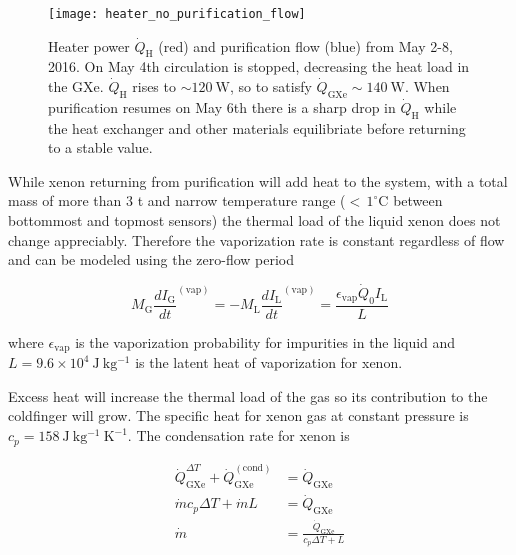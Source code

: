 \begin{figure}
\centering
\texttt{[image: heater\_no\_purification\_flow]}
\caption[Heater power $\dot{Q}_{\mathrm{H}}$ and purification flow from May 2-8, 2016.  Circulation is stopped on May 4th and resumed on the
6th, forcing $\dot{Q}_{\mathrm{H}}$ and $\dot{Q}_{\mathrm{GXe}}$ to equilibriate to new conditions.]{Heater power $\dot{Q}_{\mathrm{H}}$
(red) and purification flow (blue) from May 2-8, 2016.  On May 4th circulation is stopped,
decreasing the heat load in the GXe.  $\dot{Q}_{\mathrm{H}}$ rises to ${\sim}120\ \mathrm{W}$, so to satisfy
 $\dot{Q}_{\mathrm{GXe}} \sim 140\ \mathrm{W}$.  When purification resumes on
May 6th there is a sharp drop in $\dot{Q}_{\mathrm{H}}$ while the heat exchanger and other materials equilibriate before returning to a
stable value.}
\label{fig:electron_lifetime_model_vap_and_cond_no_flow}
\end{figure}

While xenon returning from purification will add heat to the system, with a total mass of more than 3 t and narrow temperature range
(${<}\, 1^{\circ}\mathrm{C}$ between bottommost and topmost sensors) the thermal load of the liquid xenon does not
change appreciably.  Therefore the vaporization rate is constant regardless of flow and can be modeled using the zero-flow period

\vspace{-10pt}

\begin{equation}
M_{\mathrm{G}} \frac{dI_{\mathrm{G}}}{dt}^{(\mathrm{vap})} = -M_{\mathrm{L}} \frac{dI_{\mathrm{L}}}{dt}^{(\mathrm{vap})} =
\frac{\epsilon_{\mathrm{vap}} \dot{Q}_0 I_{\mathrm{L}}}{L}
\end{equation}

\noindent where $\epsilon_{\mathrm{vap}}$ is the vaporization probability for impurities in the liquid and
$L = 9.6 \times 10^4\ \mathrm{J\ kg^{-1}}$ is the latent heat of vaporization for xenon.

Excess heat will increase the thermal load of the gas so its contribution to the coldfinger will grow.  The specific heat for
xenon gas at constant pressure is $c_p = 158\ \mathrm{J\ kg^{-1}\ K^{-1}}$.  The condensation rate for xenon is

\begin{equation}
\begin{aligned}
\dot{Q}_{\mathrm{GXe}}^{\Delta T} + \dot{Q}_{\mathrm{GXe}}^{(\mathrm{cond})} &= \dot{Q}_{\mathrm{GXe}} \\
\dot{m} c_p \Delta T + \dot{m} L &= \dot{Q}_{\mathrm{GXe}} \\
\dot{m} &= \frac{\dot{Q}_{\mathrm{GXe}}}{c_p \Delta T + L}
\end{aligned}
\end{equation}

